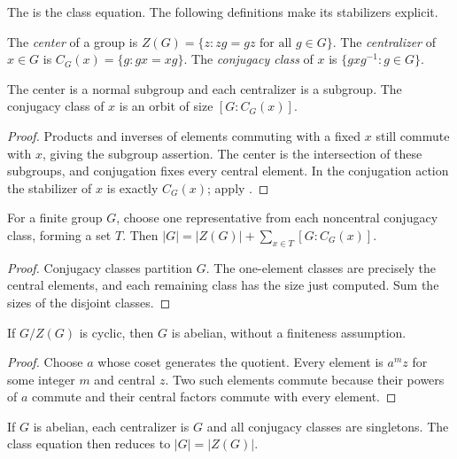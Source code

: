 The  is the class equation.
The following definitions make its stabilizers explicit.

\begin{definition}\label{center-centralizer}
The \emph{center} of a group is
$Z(G)=\{z:zg=gz\text{ for all }g\in G\}$.
The \emph{centralizer} of $x\in G$ is
$C_G(x)=\{g:gx=xg\}$.
The \emph{conjugacy class} of $x$ is $\{gxg^{-1}:g\in G\}$.
\end{definition}
\begin{proposition}\label{center-centralizer-properties}
The center is a normal subgroup and each centralizer is a subgroup.
The conjugacy class of $x$ is an orbit of size $[G:C_G(x)]$.
\end{proposition}
\begin{proof}\label{center-centralizer-properties-proof}
Products and inverses of elements commuting with a fixed $x$ still
commute with $x$, giving the subgroup assertion. The center is the
intersection of these subgroups, and conjugation fixes every central
element. In the conjugation action the stabilizer of $x$ is exactly
$C_G(x)$; apply .
\end{proof}
\begin{theorem}\label{class-equation}
For a finite group $G$, choose one representative from each noncentral
conjugacy class, forming a set $T$. Then
$|G|=|Z(G)|+\sum_{x\in T}[G:C_G(x)]$.
\end{theorem}
\begin{proof}\label{class-equation-proof}
Conjugacy classes partition $G$. The one-element classes are precisely
the central elements, and each remaining class has the size just
computed. Sum the sizes of the disjoint classes.
\end{proof}
\begin{proposition}\label{cyclic-central-quotient}
If $G/Z(G)$ is cyclic, then $G$ is abelian, without a finiteness assumption.
\end{proposition}
\begin{proof}\label{cyclic-central-quotient-proof}
Choose $a$ whose coset generates the quotient. Every element is
$a^mz$ for some integer $m$ and central $z$. Two such elements commute
because their powers of $a$ commute and their central factors commute
with every element.
\end{proof}
\begin{example}\label{abelian-conjugacy}
If $G$ is abelian, each centralizer is $G$ and all conjugacy classes
are singletons. The class equation then reduces to $|G|=|Z(G)|$.
\end{example}
